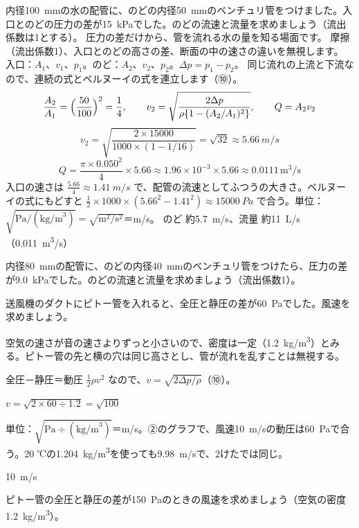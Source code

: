 \begin{phreidai}[ベンチュリ流量計]
\label{ph:力-13:ex6}内径\qty{100}{mm}の水の配管に、のどの内径\qty{50}{mm}のベンチュリ管をつけました。入口とのどの圧力の差が\qty{15}{kPa}でした。のどの流速と流量を求めましょう（流出係数は1とする）。
\phbamen
圧力の差だけから、管を流れる水の量を知る場面です。
\phmushi
摩擦（流出係数1）、入口とのどの高さの差、断面の中の速さの違いを無視します。
\phzu
入口：$A_1$、$v_1$、$p_1$。のど：$A_2$、$v_2$、$p_2$。$\Delta p=p_1-p_2$。
\phriyu
同じ流れの上流と下流なので、連続の式とベルヌーイの式を連立します（⑩）。
\phtateru
\[ \frac{A_2}{A_1}=\Bigl(\frac{50}{100}\Bigr)^2=\frac{1}{4},\qquad v_2=\sqrt{\frac{2\Delta p}{\rho\{1-(A_2/A_1)^2\}}},\qquad Q=A_2v_2 \]
\phtoku
\[ v_2=\sqrt{\frac{2\times\num{15000}}{1000\times(1-1/16)}}=\sqrt{32}\approx\qty{5.66}{m/s} \]
\[ Q=\frac{\pi\times0.050^2}{4}\times5.66\approx1.96\times10^{-3}\times5.66\approx0.0111\,\mathrm{m^3/s} \]
\phtashikame
入口の速さは $\tfrac{5.66}{4}\approx\qty{1.41}{m/s}$ で、配管の流速としてふつうの大きさ。ベルヌーイの式にもどすと $\tfrac{1}{2}\times1000\times(5.66^2-1.41^2)\approx\qty{15000}{Pa}$ で合う。単位：$\sqrt{\text{Pa}/(\text{kg/m}^3)}=\sqrt{\text{m}^2/\text{s}^2}$＝m/s。
\kotae のど 約\qty{5.7}{m/s}、流量 約\qty{11}{L/s}（\qty{0.011}{m^3/s}）
\end{phreidai}
\begin{jibun}
内径\qty{80}{mm}の配管に、のどの内径\qty{40}{mm}のベンチュリ管をつけたら、圧力の差が\qty{9.0}{kPa}でした。のどの流速と流量を求めましょう（流出係数1）。
\end{jibun}

\begin{reidai}[ピトー管で風速を測る]
\label{ph:力-13:ex7}送風機のダクトにピトー管を入れると、全圧と静圧の差が\qty{60}{Pa}でした。風速を求めましょう。
\par{} 空気の速さが音の速さよりずっと小さいので、密度は一定（\qty{1.2}{kg/m^3}）とみる。ピトー管の先と横の穴は同じ高さとし、管が流れを乱すことは無視する。
\par\kangaekata 全圧－静圧＝動圧 $\tfrac{1}{2}\rho v^2$ なので、$v=\sqrt{2\Delta p/\rho}$（⑩）。
\par\shiki $v=\sqrt{2\times60\div1.2}=\sqrt{100}$
\par{} 単位：$\sqrt{\text{Pa}\div(\text{kg/m}^3)}$＝m/s。②のグラフで、風速\qty{10}{m/s}の動圧は\qty{60}{Pa}で合う。20 ℃の\qty{1.204}{kg/m^3}を使っても\qty{9.98}{m/s}で、2けたでは同じ。
\par\kotae \qty{10}{m/s}
\end{reidai}
\begin{jibun}
ピトー管の全圧と静圧の差が\qty{150}{Pa}のときの風速を求めましょう（空気の密度\qty{1.2}{kg/m^3}）。
\end{jibun}

